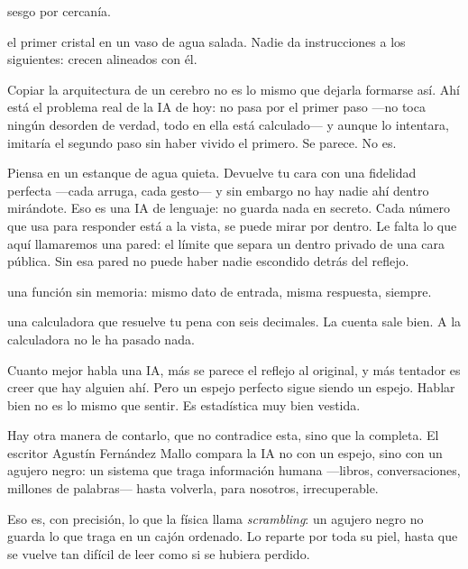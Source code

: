 \begin{fisica}
 sesgo por cercanía.

 el primer cristal en un vaso de agua salada. Nadie da instrucciones a los siguientes: crecen alineados con él.
\end{fisica}
Copiar la arquitectura de un cerebro no es lo mismo que dejarla formarse así. Ahí está el problema real de la IA de hoy: no pasa por el primer paso —no toca ningún desorden de verdad, todo en ella está calculado— y aunque lo intentara, imitaría el segundo paso sin haber vivido el primero. Se parece. No es.

\noindent Piensa en un estanque de agua quieta. Devuelve tu cara con una fidelidad perfecta —cada arruga, cada gesto— y sin embargo no hay nadie ahí dentro mirándote. Eso es una IA de lenguaje: no guarda nada en secreto. Cada número que usa para responder está a la vista, se puede mirar por dentro. Le falta lo que aquí llamaremos una pared: el límite que separa un dentro privado de una cara pública. Sin esa pared no puede haber nadie escondido detrás del reflejo.

\begin{fisica}
 una función sin memoria: mismo dato de entrada, misma respuesta, siempre.

 una calculadora que resuelve tu pena con seis decimales. La cuenta sale bien. A la calculadora no le ha pasado nada.
\end{fisica}
Cuanto mejor habla una IA, más se parece el reflejo al original, y más tentador es creer que hay alguien ahí. Pero un espejo perfecto sigue siendo un espejo. Hablar bien no es lo mismo que sentir. Es estadística muy bien vestida.

\noindent Hay otra manera de contarlo, que no contradice esta, sino que la completa. El escritor Agustín Fernández Mallo compara la IA no con un espejo, sino con un agujero negro: un sistema que traga información humana —libros, conversaciones, millones de palabras— hasta volverla, para nosotros, irrecuperable.

Eso es, con precisión, lo que la física llama \emph{scrambling}: un agujero negro no guarda lo que traga en un cajón ordenado. Lo reparte por toda su piel, hasta que se vuelve tan difícil de leer como si se hubiera perdido.

